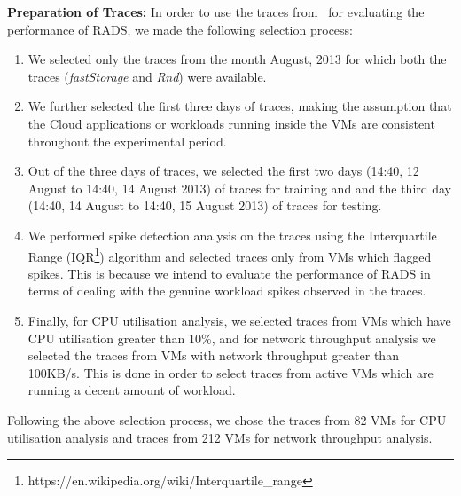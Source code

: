 \textbf{Preparation of Traces:}
\label{sec:preparaiton_of_traces}
In order to use the traces from~\cite{workloadCCGRID:2015} for evaluating the performance of RADS, we made the following selection process:
\begin{enumerate}[{(1)}]
\item We selected only the traces from the month August, 2013 for which both the traces (\textit{fastStorage} and \textit{Rnd}) were available. 
\item We further selected the first three days of traces, making the assumption that the Cloud applications or workloads running inside the VMs are consistent throughout the experimental period. 
\item Out of the three days of traces, we selected the first two days (14:40, 12 August to 14:40, 14 August 2013) of traces for training and and the third day (14:40, 14 August to 14:40, 15 August 2013) of traces for testing. 
\item We performed spike detection analysis on the traces using the Interquartile Range (IQR\footnote{https://en.wikipedia.org/wiki/Interquartile\_range}) algorithm and selected traces only from VMs which flagged spikes. This is because we intend to evaluate the performance of RADS in terms of dealing with the genuine workload spikes observed in the traces. 
\item Finally, for CPU utilisation analysis, we selected traces from VMs which have CPU utilisation greater than 10\%, and for network throughput analysis we selected the traces from VMs with network throughput greater than 100KB/s. This is done in order to select traces from active VMs which are running a decent amount of workload. 
\end{enumerate}

Following the above selection process, we chose the traces from 82 VMs for CPU utilisation analysis and traces from 212 VMs for network throughput analysis.

